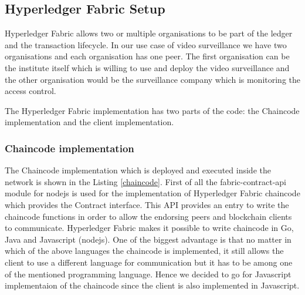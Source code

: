 \subsection{Hyperledger Fabric Setup}
Hyperledger Fabric allows two or multiple organisations to be part of the ledger and the transaction lifecycle. In our use case of video surveillance we have two organisations and each organisation has one peer. The first organisation can be the institute itself which is willing to use and deploy the video surveillance and the other organisation would be the surveillance company which is monitoring the access control. 

The Hyperledger Fabric implementation has two parts of the code: the Chaincode implementation and the client implementation. 

\subsubsection{Chaincode implementation}

The Chaincode implementation which is deployed and executed inside the network is shown in the Listing \ref{chaincode}. First of all the {\selectfont fabric-contract-api} module for nodejs is used for the implementation of Hyperledger Fabric chaincode which provides the {\selectfont Contract} interface. This API provides an entry to write the chaincode functions in order to allow the endorsing peers and blockchain clients to communicate. Hyperledger Fabric makes it possible to write chaincode in Go, Java and Javascript (nodejs). One of the biggest advantage is that no matter in which of the above languages the chaincode is implemented, it still allows the client to use a different language for communication but it has to be among one of the mentioned programming language. 
Hence we decided to go for Javascript implementaion of the chaincode since the client is also implemented in Javascript. 

